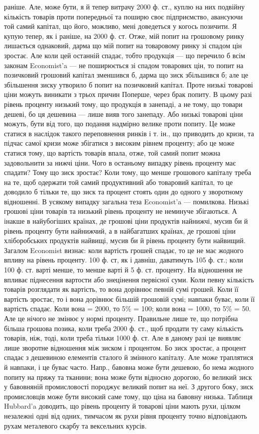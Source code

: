 раніше. Але, може бути, я й тепер витрачу 2000 ф. ст., куплю на них подвійну
кількість товарів проти попередньої та поширю своє підприємство, авансуючи
той самий капітал, що його, можливо, мені доведеться у когось позичити. Я купую
тепер, як і раніше, на 2000 ф. ст. Отже, мій попит на грошовому ринку лишається
однаковий, дарма що мій попит на товаровому ринку зі спадом цін зростає.
Але коли цей останній спадає, тобто продукція — що перечило б всім законам
Economist'a — не поширюється зі спадом товарових цін, то попит на
позичковий грошовий капітал зменшився б, дарма що зиск збільшився б; але
це збільшення зиску утворило б попит на позичковий капітал. Проте низькі
товарові ціни можуть виникати з трьох причин Поперше, через брак попиту.
В цьому разі рівень проценту низький тому, що продукція в занепаді, а не
тому, що товари дешеві, бо ця дешевина — лише вияв того занепаду. Або
низькі товарові ціни можуть, бути від того, що подання надмірно велике проти
попиту. Це може статися в наслідок такого переповнення ринків і т. ін.,
що приводить до кризи, та підчас самої кризи може збігатися з високим рівнем
проценту; або це може статися тому, що вартість товарів впала, отже, той
самий попит можна задовольнити за нижчі ціни. Чого в останьому випадку рівень
проценту має спадати? Тому що зиск зростає? Коли тому, що менше грошового
капіталу треба на те, щоб одержати той самий продуктивний або товаровий
капітал, то це доводило б тільки те, що зиск та процент стоять один до одного
у зворотному відношенні. В усякому випадку загальна теза Economist’a — помилкова.
Низькі грошові ціни товарів та низький рівень проценту не неминуче збігаються.
А інакше в найубогіших країнах, де грошові ціни продуктів найнижчі,
мусив би й рівень проценту бути найнижчий, а в найбагатших країнах, де
грошові ціни хліборобських продуктів найвищі, мусив би й рівень проценту
бути найвищий. Загалом Economist визнає: коли вартість грошей спадає, то це
не має жодного впливу на рівень проценту. 100 ф. ст, як і давніш, даватимуть
105 ф. ст.; коли 100 ф. ст. варті менше, то менше варті й 5 ф. ст. проценту.
На відношення не впливає піднесення вартости або знецінення первісної суми.
Коли певну кількість товарів розглядати як вартість, то вона дорівнює певній
сумі грошей. Коли її вартість зростає, то і вона дорівнює більшій грошовій
сумі; навпаки буває, коли її вартість спадає. Коли вона = 2000, то 5\% =
100; коли вона = 1000, то 5\% = 50. Але це нічого не змінює у нормі проценту.
Правильне лише те, що потрібна більша грошова позика, коли треба
2000 ф. ст., щоб продати ту саму кількість товарів, ніж, тоді, коли треба
тільки 1000 ф. ст. Але в даному разі це виявляє лише зворотне відношення
між зиском і процентом. Бо зиск зростає, а процент спадає з дешевиною елементів
сталого й змінного капіталу. Але може траплятися й навпаки, і це буває
часто. Напр., бавовна може бути дешевою, бо нема жодного попиту на
пряжу та тканини; вона може бути відносно дорогою, бо великий зиск у бавовняній
промисловості породжує великий попит на неї. З другого боку, зиск промисловців
може бути високий саме тому, що ціна на бавовну низька. Таблиця
Hubbard’a доводить, що рівень проценту й товарові ціни мають рухи, цілком незалежні
одні від одних, тимчасом як рухи рівня проценту точно відповідають
рухам металевого скарбу та вексельних курсів.

